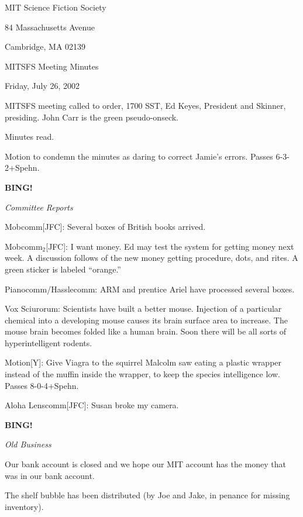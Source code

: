 \documentclass[12pt]{article}
\newcommand{\bing}{{\bf BING!} }
\newcommand{\goto}[1]{\bing \vskip 12pt \centerline{{\em{#1}}}}
\begin{document}
\begin{center}

MIT Science Fiction Society 

84 Massachusetts Avenue

Cambridge, MA 02139

\vspace{12pt}

MITSFS Meeting Minutes 

Friday, July 26, 2002

\end{center}
 
\vspace{18pt}

\setlength{\parskip}{6pt}

\noindent
MITSFS meeting called to order, 1700 SST,
Ed Keyes, President and Skinner, presiding.
John Carr is the green pseudo-onseck.

Minutes read.

Motion to condemn the minutes as daring to correct Jamie's errors.
Passes \hbox{6-3-2+Spehn}.

\goto{Committee Reports}

Mobcomm[JFC]: Several boxes of British books arrived.

Mobcomm$_2$[JFC]: I want money.  Ed may test the system for getting
money next week.  A discussion follows of the new money getting procedure,
dots, and rites.  A green sticker is labeled ``orange.''

Pianocomm/Hasslecomm: ARM and prentice Ariel have processed several boxes.

Vox Sciurorum: Scientists have built a better mouse.  Injection of
a particular chemical into a developing mouse causes its brain
surface area to increase.  The mouse brain becomes folded like a
human brain.  Soon there will be all sorts of hyperintelligent
rodents.

Motion[Y]: Give Viagra to the squirrel Malcolm saw eating a plastic
wrapper instead of the muffin inside the wrapper, to keep the species
intelligence low.  Passes \hbox{8-0-4+Spehn}.

Aloha Lenscomm[JFC]: Susan broke my camera.

\goto{Old Business}

Our bank account is closed and we hope our MIT account has the money
that was in our bank account.

The shelf bubble has been distributed (by Joe and Jake, in penance for
missing inventory).
\end{document}
